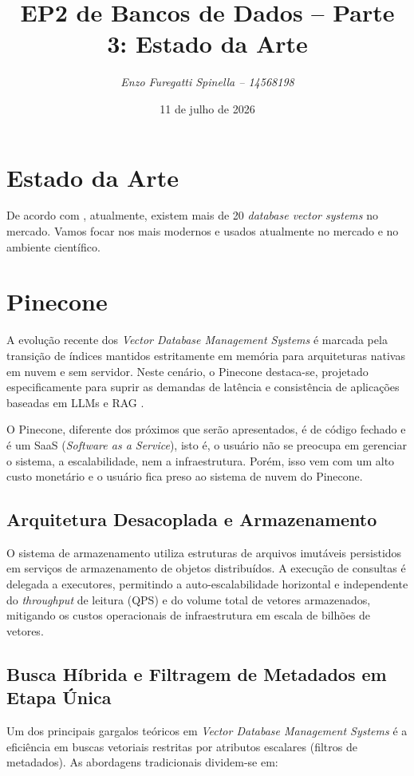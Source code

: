 \documentclass[a4paper, 12pt]{article}
\title{\textbf{EP2 de Bancos de Dados -- Parte 3: Estado da Arte}}
\author{\small\textit{Enzo Furegatti Spinella -- 14568198}}
\date{11 de julho de 2026}
\begin{document}
\maketitle

\section{Estado da Arte}
\label{sec:estado_da_arte}

De acordo com \textcite{pan2023survey}, atualmente, existem mais de 20 \textit{database vector systems} no mercado. Vamos focar nos mais modernos e usados atualmente no mercado e no ambiente científico.

\section{Pinecone}
\label{sec:pinecone}

A evolução recente dos \textit{Vector Database Management Systems} é marcada pela transição de índices mantidos estritamente em memória para arquiteturas nativas em nuvem e sem servidor. Neste cenário, o Pinecone destaca-se, projetado especificamente para suprir as demandas de latência e consistência de aplicações baseadas em LLMs e RAG \cite{zhan2025bigvectorbench}.

O Pinecone, diferente dos próximos que serão apresentados, é de código fechado e é um SaaS (\textit{Software as a Service}), isto é, o usuário não se preocupa em gerenciar o sistema, a escalabilidade, nem a infraestrutura. Porém, isso vem com um alto custo monetário e o usuário fica preso ao sistema de nuvem do Pinecone.

\subsection{Arquitetura Desacoplada e Armazenamento}
O sistema de armazenamento utiliza estruturas de arquivos imutáveis persistidos em serviços de armazenamento de objetos distribuídos. A execução de consultas é delegada a executores, permitindo a auto-escalabilidade horizontal e independente do \textit{throughput} de leitura (QPS) e do volume total de vetores armazenados, mitigando os custos operacionais de infraestrutura em escala de bilhões de vetores.

\subsection{Busca Híbrida e Filtragem de Metadados em Etapa Única}
Um dos principais gargalos teóricos em \textit{Vector Database Management Systems} é a eficiência em buscas vetoriais restritas por atributos escalares (filtros de metadados). As abordagens tradicionais dividem-se em:
\end{document}

